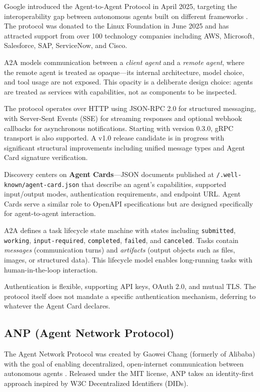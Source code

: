 \documentclass[11pt,a4paper]{article}
\begin{document}
Google introduced the Agent-to-Agent Protocol in April 2025, targeting the interoperability gap between autonomous agents built on different frameworks \cite{a2a-spec}. The protocol was donated to the Linux Foundation in June 2025 and has attracted support from over 100 technology companies including AWS, Microsoft, Salesforce, SAP, ServiceNow, and Cisco.

A2A models communication between a \textit{client agent} and a \textit{remote agent}, where the remote agent is treated as opaque---its internal architecture, model choice, and tool usage are not exposed. This opacity is a deliberate design choice: agents are treated as services with capabilities, not as components to be inspected.

The protocol operates over HTTP using JSON-RPC 2.0 for structured messaging, with Server-Sent Events (SSE) for streaming responses and optional webhook callbacks for asynchronous notifications. Starting with version 0.3.0, gRPC transport is also supported. A v1.0 release candidate is in progress with significant structural improvements including unified message types and Agent Card signature verification.

Discovery centers on \textbf{Agent Cards}---JSON documents published at \texttt{/.well-known/agent-card.json} that describe an agent's capabilities, supported input/output modes, authentication requirements, and endpoint URL. Agent Cards serve a similar role to OpenAPI specifications but are designed specifically for agent-to-agent interaction.

A2A defines a task lifecycle state machine with states including \texttt{submitted}, \texttt{working}, \texttt{input-required}, \texttt{completed}, \texttt{failed}, and \texttt{canceled}. Tasks contain \textit{messages} (communication turns) and \textit{artifacts} (output objects such as files, images, or structured data). This lifecycle model enables long-running tasks with human-in-the-loop interaction.

Authentication is flexible, supporting API keys, OAuth 2.0, and mutual TLS. The protocol itself does not mandate a specific authentication mechanism, deferring to whatever the Agent Card declares.

\subsection{ANP (Agent Network Protocol)}

The Agent Network Protocol was created by Gaowei Chang (formerly of Alibaba) with the goal of enabling decentralized, open-internet communication between autonomous agents \cite{anp-spec}. Released under the MIT license, ANP takes an identity-first approach inspired by W3C Decentralized Identifiers (DIDs).
\end{document}

